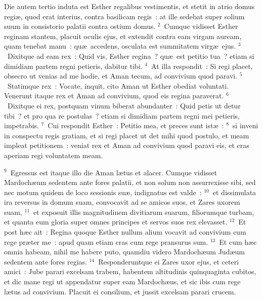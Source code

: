 \lettrine[lines=10,image=true,loversize=0.05,lraise=-0.03]{D}{}ie autem tertio induta est Esther regalibus vestimentis, et stetit in atrio domus regi\ae , quod erat interius, contra basilicam regis~: at ille sedebat super solium suum in consistorio palatii contra ostium domus.
${}^{2}$~Cumque vidisset Esther reginam stantem, placuit oculis ejus, et extendit contra eam virgam auream, quam tenebat manu~: qu\ae\ accedens, osculata est summitatem virg\ae\ ejus.
${}^{3}$~Dixitque ad eam rex~: Quid vis, Esther regina~? qu\ae\ est petitio tua~? etiam si dimidiam partem regni petieris, dabitur tibi.
${}^{4}$~At illa respondit~: Si regi placet, obsecro ut venias ad me hodie, et Aman tecum, ad convivium quod paravi.
${}^{5}$~Statimque rex~: Vocate, inquit, cito Aman ut Esther obediat voluntati. Venerunt itaque rex et Aman ad convivium, quod eis regina paraverat.
${}^{6}$~Dixitque ei rex, postquam vinum biberat abundanter~: Quid petis ut detur tibi~? et pro qua re postulas~? etiam si dimidiam partem regni mei petieris, impetrabis.
${}^{7}$~Cui respondit Esther~: Petitio mea, et preces sunt ist\ae~:
${}^{8}$~si inveni in conspectu regis gratiam, et si regi placet ut det mihi quod postulo, et meam impleat petitionem~: veniat rex et Aman ad convivium quod paravi eis, et cras aperiam regi voluntatem meam.


${}^{9}$~Egressus est itaque illo die Aman l\ae tus et alacer. Cumque vidisset Mardoch\ae um sedentem ante fores palatii, et non solum non assurrexisse sibi, sed nec motum quidem de loco sessionis su\ae , indignatus est valde~:
${}^{10}$~et dissimulata ira reversus in domum suam, convocavit ad se amicos suos, et Zares uxorem suam,
${}^{11}$~et exposuit illis magnitudinem divitiarum suarum, filiorumque turbam, et quanta eum gloria super omnes principes et servos suos rex elevasset.
${}^{12}$~Et post h\ae c ait~: Regina quoque Esther nullum alium vocavit ad convivium cum rege pr\ae ter me~: apud quam etiam cras cum rege pransurus sum.
${}^{13}$~Et cum h\ae c omnia habeam, nihil me habere puto, quamdiu videro Mardoch\ae um Jud\ae um sedentem ante fores regias.
${}^{14}$~Responderuntque ei Zares uxor ejus, et ceteri amici~: Jube parari excelsam trabem, habentem altitudinis quinquaginta cubitos, et dic mane regi ut appendatur super eam Mardoch\ae us, et sic ibis cum rege l\ae tus ad convivium. Placuit ei consilium, et jussit excelsam parari crucem.

